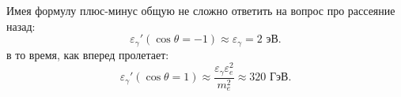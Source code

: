 Имея формулу плюс-минус общую не сложно ответить на вопрос про рассеяние назад:
\begin{equation*}
	\varepsilon_\gamma' (\cos \theta = -1) \approx \varepsilon_\gamma = 2 \text{ эВ}. 
\end{equation*}
в то время, как вперед пролетает:
\begin{equation*}
	\varepsilon_\gamma' (\cos \theta = 1) \approx \frac{\varepsilon_\gamma \varepsilon_e^2}{m_e^2} \approx 320 \text{ ГэВ}. 
\end{equation*}